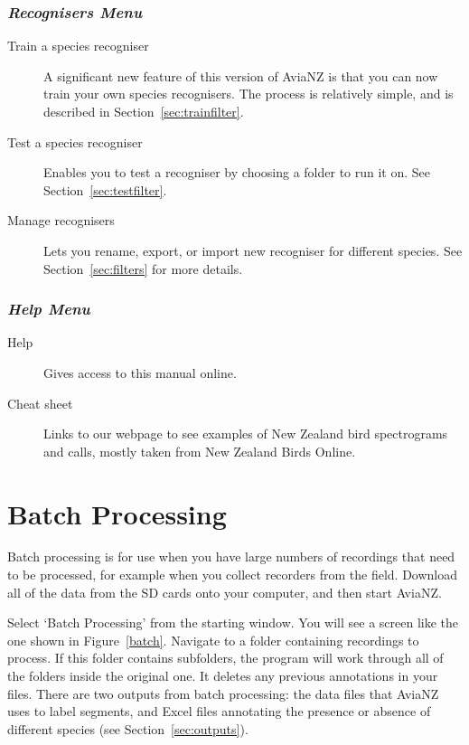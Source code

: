 \documentclass{article}
\begin{document}
\subsubsection{{\em Recognisers Menu}}

\begin{description}
\item [Train a species recogniser] A significant new feature of this version of AviaNZ is that you can now train your own species recognisers. The process is relatively simple, and is described in Section~\ref{sec:trainfilter}.
\item [Test a species recogniser] Enables you to test a recogniser by choosing a folder to run it on. See Section~\ref{sec:testfilter}.
\item[Manage recognisers] Lets you rename, export, or import new recogniser for different species. See Section~\ref{sec:filters} for more details.
\end{description}

\subsubsection{{\em Help Menu}}

\begin{description}
\item [Help] Gives access to this manual online.
\item [Cheat sheet] Links to our webpage to see examples of New Zealand bird spectrograms and calls, mostly taken from New Zealand Birds Online.
\end{description}

\section{Batch Processing}
\label{sec:auto}

Batch processing is for use when you have large numbers of recordings that need to be processed, for example when you collect recorders from the field. Download all of the data from the SD cards onto your computer, and then start AviaNZ. 

Select `Batch Processing' from the starting window. You will see a screen like the one shown in Figure~\ref{batch}. Navigate to a folder containing recordings to process. If this folder contains subfolders, the program will work through all of the folders inside the original one. It deletes any previous annotations in your files. There are two outputs from batch processing: the data files that AviaNZ uses to label segments, and Excel files annotating the presence or absence of different species (see Section~\ref{sec:outputs}).
\end{document}
